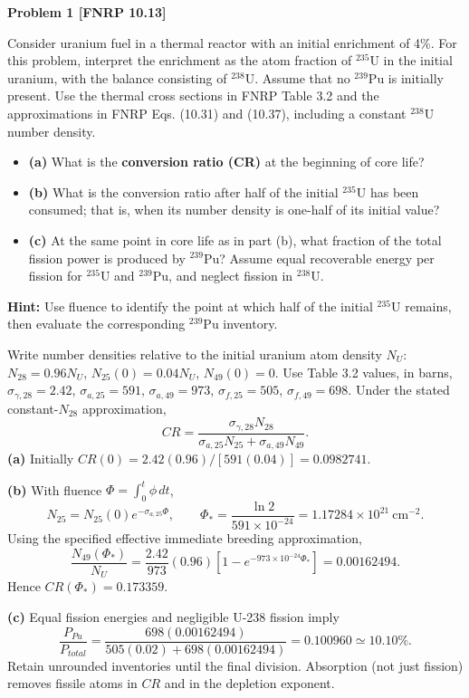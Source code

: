 \noindent\textbf{Problem 1 [FNRP 10.13]}

Consider uranium fuel in a thermal reactor with an initial enrichment of 4\%. For this problem, interpret the enrichment as the atom fraction of \({}^{235}\mathrm{U}\) in the initial uranium, with the balance consisting of \({}^{238}\mathrm{U}\). Assume that no \({}^{239}\mathrm{Pu}\) is initially present. Use the thermal cross sections in FNRP Table 3.2 and the approximations in FNRP Eqs. (10.31) and (10.37), including a constant \({}^{238}\mathrm{U}\) number density.

\begin{itemize}
\tightlist
\item
  \textbf{(a)} What is the \textbf{conversion ratio (CR)} at the beginning of core life?
\item
  \textbf{(b)} What is the conversion ratio after half of the initial \({}^{235}\mathrm{U}\) has been consumed; that is, when its number density is one-half of its initial value?
\item
  \textbf{(c)} At the same point in core life as in part (b), what fraction of the total fission power is produced by \({}^{239}\mathrm{Pu}\)? Assume equal recoverable energy per fission for \({}^{235}\mathrm{U}\) and \({}^{239}\mathrm{Pu}\), and neglect fission in \({}^{238}\mathrm{U}\).
\end{itemize}

\textbf{Hint:} Use fluence to identify the point at which half of the initial \({}^{235}\mathrm{U}\) remains, then evaluate the corresponding \({}^{239}\mathrm{Pu}\) inventory.

\begin{adaptedsolution}

Write number densities relative to the initial uranium atom density $N_U$:
$N_{28}=0.96N_U$, $N_{25}(0)=0.04N_U$, $N_{49}(0)=0$.
Use Table 3.2 values, in barns,
$\sigma_{\gamma,28}=2.42$, $\sigma_{a,25}=591$,
$\sigma_{a,49}=973$, $\sigma_{f,25}=505$, $\sigma_{f,49}=698$.
Under the stated constant-$N_{28}$ approximation,
\[
CR=\frac{\sigma_{\gamma,28}N_{28}}
{\sigma_{a,25}N_{25}+\sigma_{a,49}N_{49}}.
\]
\textbf{(a)} Initially $\boxed{CR(0)=2.42(0.96)/[591(0.04)]=0.0982741}$.

\textbf{(b)} With fluence $\Phi=\int_0^t\phi\,dt$,
\[
N_{25}=N_{25}(0)e^{-\sigma_{a,25}\Phi},\qquad
\Phi_* =\frac{\ln2}{591\times10^{-24}}
=1.17284\times10^{21}~\mathrm{cm^{-2}}.
\]
Using the specified effective immediate breeding approximation,
\[
\frac{N_{49}(\Phi_*)}{N_U}
=\frac{2.42}{973}(0.96)[1-e^{-973\times10^{-24}\Phi_*}]
=0.00162494.
\]
Hence $\boxed{CR(\Phi_*)=0.173359}$.

\textbf{(c)} Equal fission energies and negligible U-238 fission imply
\[
\boxed{\frac{P_{Pu}}{P_{total}}=
\frac{698(0.00162494)}{505(0.02)+698(0.00162494)}
=0.100960\simeq10.10\%}.
\]
Retain unrounded inventories until the final division. Absorption (not just
fission) removes fissile atoms in $CR$ and in the depletion exponent.

\end{adaptedsolution}

